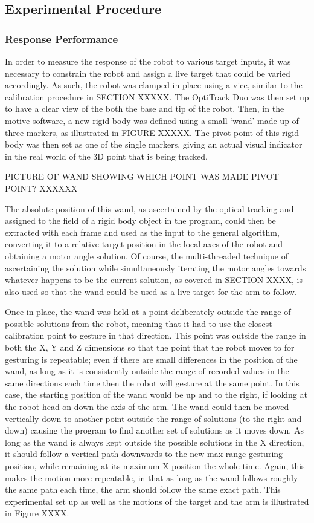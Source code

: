 \documentclass[11pt]{article}
\begin{document}
\subsection{Experimental Procedure}

\subsubsection{Response Performance}
In order to measure the response of the robot to various target inputs, it was necessary to constrain the robot and assign a live target that could be varied accordingly. As such, the robot was clamped in place using a vice, similar to the calibration procedure in SECTION XXXXX. The OptiTrack Duo was then set up to have a clear view of the both the base and tip of the robot. Then, in the motive software, a new rigid body was defined using a small `wand' made up of three-markers, as illustrated in FIGURE XXXXX. The pivot point of this rigid body was then set as one of the single markers, giving an actual visual indicator in the real world of the 3D point that is being tracked.

PICTURE OF WAND SHOWING WHICH POINT WAS MADE PIVOT POINT? XXXXXX

The absolute position of this wand, as ascertained by the optical tracking and assigned to the field of a rigid body object in the program, could then be extracted with each frame and used as the input to the general algorithm, converting it to a relative target position in the local axes of the robot and obtaining a motor angle solution. Of course, the multi-threaded technique of ascertaining the solution while simultaneously iterating the motor angles towards whatever happens to be the current solution, as covered in SECTION XXXX, is also used so that the wand could be used as a live target for the arm to follow.

Once in place, the wand was held at a point deliberately outside the range of possible solutions from the robot, meaning that it had to use the closest calibration point to gesture in that direction. This point was outside the range in both the X, Y and Z dimensions so that the point that the robot moves to for gesturing is repeatable; even if there are small differences in the position of the wand, as long as it is consistently outside the range of recorded values in the same directions each time then the robot will gesture at the same point. In this case, the starting position of the wand would be up and to the right, if looking at the robot head on down the axis of the arm. The wand could then be moved vertically down to another point outside the range of solutions (to the right and down) causing the program to find another set of solutions as it moves down. As long as the wand is always kept outside the possible solutions in the X direction, it should follow a vertical path downwards to the new max range gesturing position, while remaining at its maximum X position the whole time. Again, this makes the motion more repeatable, in that as long as the wand follows roughly the same path each time, the arm should follow the same exact path. This experimental set up as well as the motions of the target and the arm is illustrated in Figure XXXX.
\end{document}
